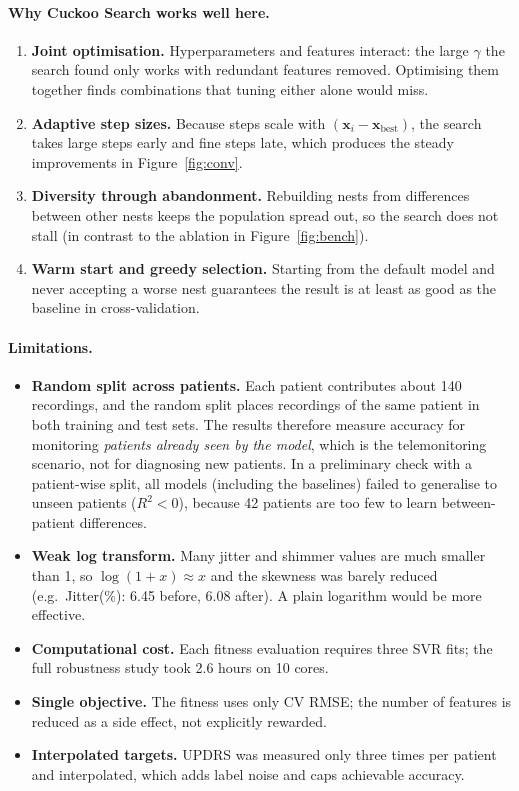 \documentclass[12pt,a4paper]{article}
\numberwithin{equation}{section}
\numberwithin{table}{section}
\numberwithin{figure}{section}
\begin{document}
\paragraph{Why Cuckoo Search works well here.}
\begin{enumerate}
  \item \textbf{Joint optimisation.} Hyperparameters and features interact: the large $\gamma$ the search found only works with redundant features removed. Optimising them together finds combinations that tuning either alone would miss.
  \item \textbf{Adaptive step sizes.} Because steps scale with $(\mathbf{x}_i - \mathbf{x}_{\text{best}})$, the search takes large steps early and fine steps late, which produces the steady improvements in Figure~\ref{fig:conv}.
  \item \textbf{Diversity through abandonment.} Rebuilding nests from differences between other nests keeps the population spread out, so the search does not stall (in contrast to the ablation in Figure~\ref{fig:bench}).
  \item \textbf{Warm start and greedy selection.} Starting from the default model and never accepting a worse nest guarantees the result is at least as good as the baseline in cross-validation.
\end{enumerate}

\paragraph{Limitations.}
\begin{itemize}
  \item \textbf{Random split across patients.} Each patient contributes about 140 recordings, and the random split places recordings of the same patient in both training and test sets. The results therefore measure accuracy for monitoring \emph{patients already seen by the model}, which is the telemonitoring scenario, not for diagnosing new patients. In a preliminary check with a patient-wise split, all models (including the baselines) failed to generalise to unseen patients ($R^2 < 0$), because 42 patients are too few to learn between-patient differences.
  \item \textbf{Weak log transform.} Many jitter and shimmer values are much smaller than 1, so $\log(1+x) \approx x$ and the skewness was barely reduced (e.g.\ Jitter(\%): 6.45 before, 6.08 after). A plain logarithm would be more effective.
  \item \textbf{Computational cost.} Each fitness evaluation requires three SVR fits; the full robustness study took 2.6 hours on 10 cores.
  \item \textbf{Single objective.} The fitness uses only CV RMSE; the number of features is reduced as a side effect, not explicitly rewarded.
  \item \textbf{Interpolated targets.} UPDRS was measured only three times per patient and interpolated, which adds label noise and caps achievable accuracy.
\end{itemize}
\end{document}
